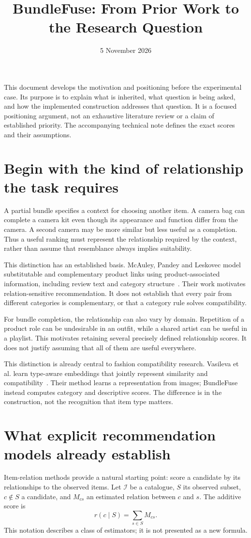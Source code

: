 \documentclass[11pt,a4paper]{article}
\title{BundleFuse: From Prior Work to the Research Question}
\author{}\date{5 November 2026}
\begin{document}
\maketitle\vspace{-18pt}
This document develops the motivation and positioning before the experimental case.
Its purpose is to explain what is inherited, what question is being asked, and how
the implemented construction addresses that question. It is a focused positioning
argument, not an exhaustive literature review or a claim of established priority.
The accompanying technical note defines the exact scores and their assumptions.

\section{Begin with the kind of relationship the task requires}
A partial bundle specifies a context for choosing another item. A camera bag can
complete a camera kit even though its appearance and function differ from the camera.
A second camera may be more similar but less useful as a completion. Thus a useful
ranking must represent the relationship required by the context, rather than assume
that resemblance always implies suitability.

This distinction has an established basis. McAuley, Pandey and Leskovec model
substitutable and complementary product links using product-associated information,
including review text and category structure~\cite{mcauley}. Their work motivates
relation-sensitive recommendation. It does not establish that every pair from
different categories is complementary, or that a category rule solves compatibility.

For bundle completion, the relationship can also vary by domain. Repetition of a
product role can be undesirable in an outfit, while a shared artist can be useful
in a playlist. This motivates retaining several precisely defined relationship
scores. It does not justify assuming that all of them are useful everywhere.

This distinction is already central to fashion compatibility research. Vasileva
et al. learn type-aware embeddings that jointly represent similarity and
compatibility~\cite{vasileva}. Their method learns a representation from images;
BundleFuse instead computes category and descriptive scores. The difference is in
the construction, not the recognition that item type matters.

\section{What explicit recommendation models already establish}
Item-relation methods provide a natural starting point: score a candidate by its
relationships to the observed items. Let $\mathcal I$ be a catalogue, $S$ its observed
subset, $c\notin S$ a candidate, and $M_{cs}$ an estimated relation between $c$ and
$s$. The additive score is
\[
 r(c\mid S)=\sum_{s\in S}M_{cs}.
\]
This notation describes a class of estimators; it is not presented as a new formula.
\end{document}
